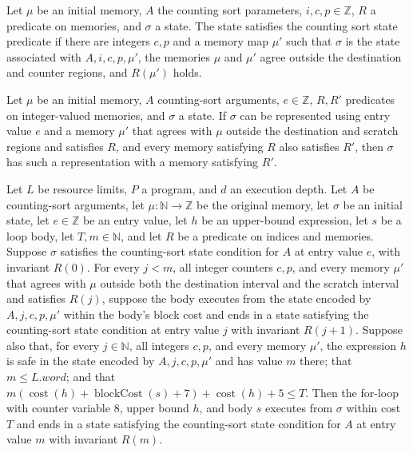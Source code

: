\begin{definition}
\label{Light.CsState}
\leanok
{}
Let $\mu$ be an initial memory, $A$ the counting sort parameters, $i,c,p\in\mathbb{Z}$,
$R$ a predicate on memories, and $\sigma$ a state. The state satisfies the counting sort
state predicate if there are integers $c,p$ and a memory map $\mu'$ such that $\sigma$
is the state associated with $A,i,c,p,\mu'$, the memories $\mu$ and $\mu'$ agree outside
the destination and counter regions, and $R(\mu')$ holds.
\end{definition}

\begin{theorem}
\label{Light.CsState.imp}
\leanok
{}
Let $\mu$ be an initial memory, $A$ counting-sort arguments, $e\in\mathbb{Z}$, $R,R'$
predicates on integer-valued memories, and $\sigma$ a state. If $\sigma$ can be
represented using entry value $e$ and a memory $\mu'$ that agrees with $\mu$ outside the
destination and scratch regions and satisfies $R$, and every memory satisfying $R$ also
satisfies $R'$, then $\sigma$ has such a representation with a memory satisfying $R'$.
\end{theorem}

\begin{theorem}
\label{Light.Ends.csFor}
\leanok
{}
Let $L$ be resource limits, $P$ a program, and $d$ an execution depth. Let $A$ be
counting-sort arguments, let $\mu:\mathbb{N}\to\mathbb{Z}$ be the original memory, let
$\sigma$ be an initial state, let $e\in\mathbb{Z}$ be an entry value, let $h$ be an
upper-bound expression, let $s$ be a loop body, let $T,m\in\mathbb{N}$, and let $R$ be a
predicate on indices and memories. Suppose $\sigma$ satisfies the counting-sort state
condition for $A$ at entry value $e$, with invariant $R(0)$. For every $j<m$, all
integer counters $c,p$, and every memory $\mu'$ that agrees with $\mu$ outside both the
destination interval and the scratch interval and satisfies $R(j)$, suppose the body
executes from the state encoded by $A,j,c,p,\mu'$ within the body's block cost and ends
in a state satisfying the counting-sort state condition at entry value $j$ with
invariant $R(j+1)$. Suppose also that, for every $j\in\mathbb{N}$, all integers $c,p$,
and every memory $\mu'$, the expression $h$ is safe in the state encoded by
$A,j,c,p,\mu'$ and has value $m$ there; that $m\leq L.word$; and that
$m(\operatorname{cost}(h)+\operatorname{blockCost}(s)+7)+\operatorname{cost}(h)+5\leq
T$. Then the for-loop with counter variable $8$, upper bound $h$, and body $s$ executes
from $\sigma$ within cost $T$ and ends in a state satisfying the counting-sort state
condition for $A$ at entry value $m$ with invariant $R(m)$.
\end{theorem}

